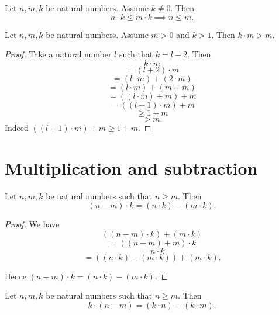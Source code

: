 \documentclass[../arithmetic.tex]{subfiles}
\begin{document}
  \begin{forthel}
    \begin{corollary}
      Let $n, m, k$ be natural numbers.
      Assume $k \neq 0$.
      Then \[ n \cdot k \leq m \cdot k \implies n \leq m. \]
    \end{corollary}
  \end{forthel}

  \begin{forthel}
    \begin{proposition}
      Let $n, m, k$ be natural numbers.
      Assume $m > 0$ and $k > 1$.
      Then $k \cdot m > m$.
    \end{proposition}
    \begin{proof}
      Take a natural number $l$ such that $k = l + 2$.
      Then
      \[  k \cdot m                       \]
      \[    = (l + 2) \cdot m             \]
      \[    = (l \cdot m) + (2 \cdot m)   \]
      \[    = (l \cdot m) + (m + m)       \]
      \[    = ((l \cdot m) + m) + m       \]
      \[    = ((l + 1) \cdot m) + m       \]
      \[    \geq 1 + m                    \]
      \[    > m.                          \]
      Indeed $((l + 1) \cdot m) + m \geq 1 + m$.
    \end{proof}
  \end{forthel}


  \section{Multiplication and subtraction}

  \begin{forthel}
    \begin{proposition}
      Let $n, m, k$ be natural numbers such that $n \geq m$.
      Then \[ (n - m) \cdot k = (n \cdot k) - (m \cdot k). \]
    \end{proposition}
    \begin{proof}
      We have
      \[  ((n - m) \cdot k) + (m \cdot k)                 \]
      \[    = ((n - m) + m) \cdot k                       \]
      \[    = n \cdot k                                   \]
      \[    = ((n \cdot k) - (m \cdot k)) + (m \cdot k).  \]

      Hence $(n - m) \cdot k = (n \cdot k) - (m \cdot k)$.
    \end{proof}
  \end{forthel}

  \begin{forthel}
    \begin{corollary}
      Let $n, m, k$ be natural numbers such that $n \geq m$.
      Then \[ k \cdot (n - m) = (k \cdot n) - (k \cdot m). \]
    \end{corollary}
  \end{forthel}
\end{document}
